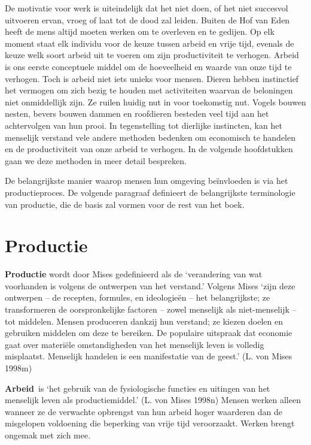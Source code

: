 \documentclass[
  a5paper,
  smalldemyvopaper,11pt,twoside,onecolumn,openright,extrafontsizes,
hidelinks]{memoir}
\begin{document}
De motivatie voor werk is uiteindelijk dat het niet doen, of het niet
succesvol uitvoeren ervan, vroeg of laat tot de dood zal leiden. Buiten
de Hof van Eden heeft de mens altijd moeten werken om te overleven en te
gedijen. Op elk moment staat elk individu voor de keuze tussen arbeid en
vrije tijd, evenals de keuze welk soort arbeid uit te voeren om zijn
productiviteit te verhogen. Arbeid is ons eerste conceptuele middel om
de hoeveelheid en waarde van onze tijd te verhogen. Toch is arbeid niet
iets unieks voor mensen. Dieren hebben instinctief het vermogen om zich
bezig te houden met activiteiten waarvan de beloningen niet onmiddellijk
zijn. Ze ruilen huidig nut in voor toekomstig nut. Vogels bouwen nesten,
bevers bouwen dammen en roofdieren besteden veel tijd aan het
achtervolgen van hun prooi. In tegenstelling tot dierlijke instincten,
kan het menselijk verstand vele andere methoden bedenken om economisch
te handelen en de productiviteit van onze arbeid te verhogen. In de
volgende hoofdstukken gaan we deze methoden in meer detail bespreken.

De belangrijkste manier waarop mensen hun omgeving beïnvloeden is via
het productieproces. De volgende paragraaf definieert de belangrijkste
terminologie van productie, die de basis zal vormen voor de rest van het
boek.

\section{Productie}\label{productie}

\textbf{Productie} wordt door Mises gedefinieerd als de `verandering van
wat voorhanden is volgens de ontwerpen van het verstand.' Volgens Mises
`zijn deze ontwerpen -- de recepten, formules, en ideologieën -- het
belangrijkste; ze transformeren de oorspronkelijke factoren -- zowel
menselijk als niet-menselijk -- tot middelen. Mensen produceren dankzij
hun verstand; ze kiezen doelen en gebruiken middelen om deze te
bereiken. De populaire uitspraak dat economie gaat over materiële
omstandigheden van het menselijk leven is volledig misplaatst. Menselijk
handelen is een manifestatie van de geest.' (L. von Mises 1998m)

\textbf{Arbeid}~is `het gebruik van de fysiologische functies en
uitingen van het menselijk leven als productiemiddel.' (L. von Mises
1998n) Mensen werken alleen wanneer ze de verwachte opbrengst van hun
arbeid hoger waarderen dan de misgelopen voldoening die beperking van
vrije tijd veroorzaakt. Werken brengt ongemak met zich mee.
\end{document}
